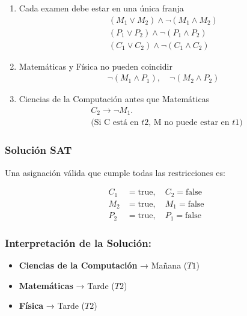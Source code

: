 \begin{enumerate}
\item Cada examen debe estar en una única franja
\begin{align*}
  (M_{1} \lor M_{2}) \land \neg (M_{1} \land M_{2}) \\
    (P_{1} \lor P_{2}) \land \neg (P_{1} \land P_{2}) \\
    (C_{1} \lor C_{2}) \land \neg (C_{1} \land C_{2})
\end{align*}

\item Matemáticas y Física no pueden coincidir
\begin{align*}
   \neg (M_{1} \land P_{1}), \quad \neg (M_{2} \land P_{2})\end{align*}

\item Ciencias de la Computación antes que Matemáticas 
\begin{align*}
    &C_{2} \rightarrow \neg M_{1}.\\
    &\text{(Si C está en $t2$, M no puede estar en $t1$)}
\end{align*}

\end{enumerate}


\subsubsection*{Solución SAT}
Una asignación válida que cumple todas las restricciones es:

\begin{align*}
    C_{1} &= \text{true}, \quad C_{2} = \text{false} \\
    M_{2} &= \text{true}, \quad M_{1} = \text{false} \\
    P_{2} &= \text{true}, \quad P_{1} = \text{false}
\end{align*}

\subsubsection*{Interpretación de la Solución:}
\begin{itemize}
    \item \textbf{Ciencias de la Computación} → Mañana (\(T1\))
    \item \textbf{Matemáticas} → Tarde (\(T2\))
    \item \textbf{Física} → Tarde (\(T2\))
\end{itemize}

